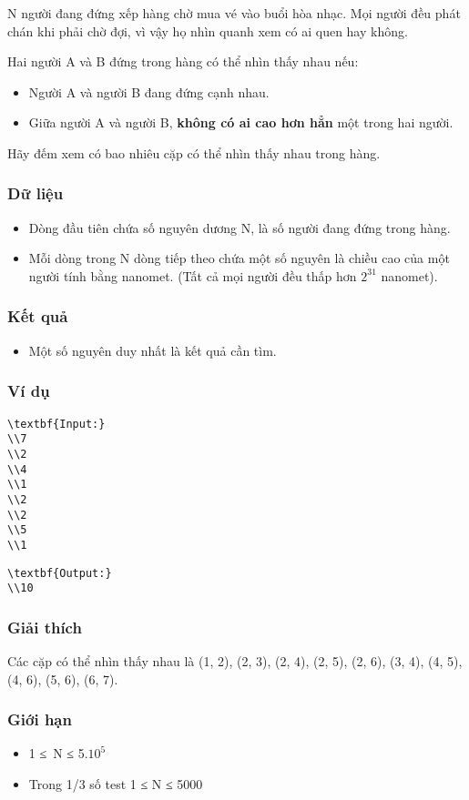 



   N người đang đứng xếp hàng chờ mua vé vào buổi hòa nhạc. Mọi người đều phát chán khi phải chờ đợi, vì vậy họ nhìn quanh xem có ai quen hay không.  

   Hai người A và B đứng trong hàng có thể nhìn thấy nhau nếu:  
\begin{itemize}
	\item     Người A và người B đang đứng cạnh nhau.   
	\item     Giữa người A và người B,    \textbf{     không có ai cao hơn hẳn    }    một trong hai người.   
\end{itemize}

   Hãy đếm xem có bao nhiêu cặp có thể nhìn thấy nhau trong hàng.  

\subsubsection{   Dữ liệu  }
\begin{itemize}
	\item     Dòng đầu tiên chứa số nguyên dương N, là số người đang đứng trong hàng.   
	\item     Mỗi dòng trong N dòng tiếp theo chứa một số nguyên là chiều cao của một người tính bằng nanomet. (Tất cả mọi người đều thấp hơn $2^{31}$    nanomet).   
\end{itemize}

\subsubsection{   Kết quả  }
\begin{itemize}
	\item     Một số nguyên duy nhất là kết quả cần tìm.   
\end{itemize}

\subsubsection{   Ví dụ  }
\begin{verbatim}
\textbf{Input:}
\\7
\\2
\\4
\\1
\\2
\\2
\\5
\\1 \end{verbatim}
\begin{verbatim}
\textbf{Output:}
\\10\end{verbatim}

\subsubsection{   Giải thích  }

   Các cặp có thể nhìn thấy nhau là (1, 2), (2, 3), (2, 4), (2, 5), (2, 6), (3, 4), (4, 5), (4, 6), (5, 6), (6, 7).  

\subsubsection{   Giới hạn  }
\begin{itemize}
	\item     1 ≤ N ≤ 5.$10^{5}$
	\item     Trong 1/3 số test 1 ≤ N ≤ 5000   
\end{itemize}
